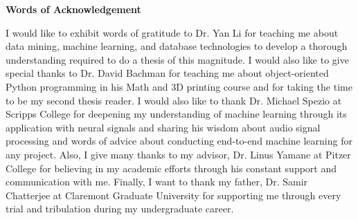 \doublespacing
\setlength{\parindent}{1cm}

\begin{center}
  \textbf{\large Words of Acknowledgement}
\end{center}
I would like to exhibit words of gratitude to Dr. Yan Li for teaching me about data mining, machine learning, and database technologies to develop a thorough understanding required to do a thesis of this magnitude. I would also like to give special thanks to Dr. David Bachman for teaching me about object-oriented Python programming in his Math and 3D printing course and for taking the time to be my second thesis reader. I would also like to thank Dr. Michael Spezio at Scripps College for deepening my understanding of machine learning through its application with neural signals and sharing his wisdom about audio signal processing and words of advice about conducting end-to-end machine learning for any project. Also, I give many thanks to my advisor, Dr. Linus Yamane at Pitzer College for believing in my academic efforts through his constant support and communication with me. Finally, I want to thank my father, Dr. Samir Chatterjee at Claremont Graduate University for supporting me through every trial and tribulation during my undergraduate career.
